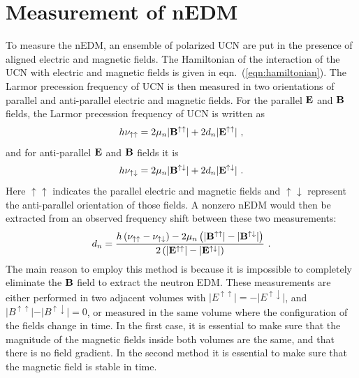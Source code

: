 


\section{Measurement of nEDM\label{sec:nedmmeasurement}}

To measure the nEDM, an ensemble of polarized UCN are put in the
presence of aligned electric and magnetic fields. The Hamiltonian of
the interaction of the UCN with electric and magnetic fields is given
in eqn.~(\ref{eqn:hamiltonian}). The Larmor precession frequency of
UCN is then measured in two orientations of parallel and anti-parallel
electric and magnetic fields. For the parallel $\bf{E}$ and $\bf{B}$
fields, the Larmor precession frequency of UCN is written as
\begin{equation}
\label{eqn:parallelEandB}
  h \nu_{\uparrow \uparrow} = 2 \mu_n \vert {\bf{B^{\uparrow \uparrow}}} \vert+ 2 d_n\vert \bf{ E^{\uparrow \uparrow}} \vert~,
\end{equation}
and for anti-parallel  $\bf{E}$ and $\bf{B}$ fields it is
\begin{equation}
\label{eqn:antiparallelEandB}
  h \nu_{\uparrow \downarrow} = 2 \mu_n \vert {\bf{B^{\uparrow \downarrow}}} \vert+ 2 d_n\vert \bf{ E^{\uparrow \downarrow}} \vert~.
\end{equation}
Here $\uparrow \uparrow$ indicates the parallel electric and magnetic
fields and $\uparrow \downarrow$ represent the anti-parallel
orientation of those fields.  A nonzero nEDM would then be extracted
from an observed frequency shift between these two measurements:
\begin{equation}
  \label{eqn:dn}
  d_n = \frac{h \left( \nu_{\uparrow \uparrow} - \nu_{\uparrow \downarrow} \right) - 2 \mu_n \left( \vert {\bf{B^{\uparrow \uparrow}}} \vert -\vert {\bf{B^{\uparrow \downarrow}}} \vert \right)}{2 \left(\vert \bf{ E^{\uparrow \uparrow}} \vert - \vert \bf{ E^{\uparrow \downarrow}} \vert \right)}~.
\end{equation}
The main reason to employ this method is because it is impossible to
completely eliminate the $\bf{B}$ field to extract the neutron
EDM. These measurements are either performed in two adjacent volumes
with
$\vert E^{\uparrow \uparrow} \vert = - \vert E^{\uparrow \downarrow}
\vert$, and
$\vert B^{\uparrow \uparrow}\vert - \vert B^{\uparrow \downarrow}
\vert= 0 $, or measured in the same volume where the configuration of
the fields change in time. In the first case, it is essential to make
sure that the magnitude of the magnetic fields inside both volumes are
the same, and that there is no field gradient. In the second method it
is essential to make sure that the magnetic field is stable in time.

